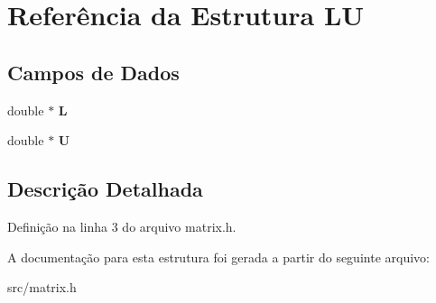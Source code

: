 \hypertarget{structLU}{}\section{Referência da Estrutura LU}
\label{structLU}
\subsection*{Campos de Dados}
\begin{DoxyCompactItemize}
\item 
\mbox{\label{structLU_ad1b87bc6e8e06cb4c0ab4716372cff00}} 
double $\ast$ {\bfseries L}
\item 
\mbox{\label{structLU_ac8d2009f85e2aee2a595864bc5a2bf82}} 
double $\ast$ {\bfseries U}
\end{DoxyCompactItemize}


\subsection{Descrição Detalhada}


Definição na linha 3 do arquivo matrix.\+h.



A documentação para esta estrutura foi gerada a partir do seguinte arquivo\+:\begin{DoxyCompactItemize}
\item 
src/matrix.\+h\end{DoxyCompactItemize}
